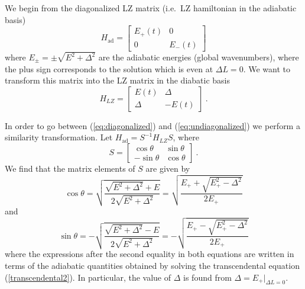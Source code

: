 \documentclass[twocolumn,english,pra,aps,superscriptaddress,floatfix]{revtex4-1}
\begin{document}
We begin from the diagonalized LZ matrix (i.e.\ LZ hamiltonian in the adiabatic basis)
\begin{equation}
H_{\mathrm{ad}}=\left[\begin{array}{cc}
E_{+}(t) & 0\\
0 & E_{-}(t) \end{array}\right]
\label{eq:diagonalized}
\end{equation}
where $E_{\pm}=\pm\sqrt{E^2+\Delta^2}$ are the adiabatic energies (global wavenumbers), where the plus sign corresponds to the solution which is even at $\Delta L=0$. We want to transform this matrix into the LZ matrix in the diabatic basis
\begin{equation}
H_{LZ}=\left[\begin{array}{cc}
E(t) & \Delta\\
\Delta & -E(t) \end{array}\right] \ .
\label{eq:undiagonalized}
\end{equation}

In order to go between (\ref{eq:diagonalized}) and (\ref{eq:undiagonalized}) we perform a similarity transformation. Let $H_{\mathrm{ad}}=S^{-1}H_{LZ}S$, where 
\begin{equation}
S=\left[\begin{array}{cc}
\cos\theta & \sin\theta\\
-\sin\theta & \cos\theta\end{array}\right] \ .
\label{Similarity Transformation}
\end{equation}
We find that the matrix elements of $S$ are given by
\begin{equation}
\cos\theta=\sqrt{\frac{\sqrt{E^{2}+\Delta^{2}}+E}{2\sqrt{E^{2}+\Delta^{2}}}}=\sqrt{\frac{E_{+}+\sqrt{E_{+}^{2}-\Delta^{2}}}{2E_{+}}}
\label{cos}
\end{equation}
and
\begin{equation}
\sin\theta=-\sqrt{\frac{\sqrt{E^{2}+\Delta^{2}}-E}{2\sqrt{E^{2}+\Delta^{2}}}}=-\sqrt{\frac{E_{+}-\sqrt{E_{+}^{2}-\Delta^{2}}}{2E_{+}}}
\label{sin}
\end{equation}
where the expressions after the second equality in both equations are written in terms of the adiabatic quantities obtained by solving the transcendental equation (\ref{transcendental2}). In particular, the value of $\Delta$ is found from $\Delta=E_{+}\vert_{\Delta L=0}$.
\end{document}
